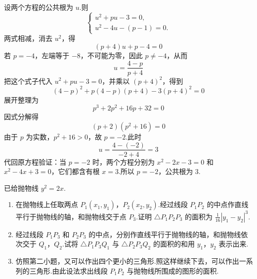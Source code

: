 \begin{solution}
设两个方程的公共根为 \(u\).则
\[
\begin{cases}
u^2+pu-3=0,\\
u^2-4u-(p-1)=0.
\end{cases}
\]
两式相减，消去 \(u^2\)，得
\[
(p+4)u+p-4=0
\]
若 \(p=-4\)，左端等于 \(-8\)，不可能为零，因此 \(p\neq-4\)，从而
\[
u=\frac{4-p}{p+4}
\]
把这个式子代入 \(u^2+pu-3=0\)，并乘以 \((p+4)^2\)，得到
\[
(4-p)^2+p(4-p)(p+4)-3(p+4)^2=0
\]
展开整理为
\[
p^3+2p^2+16p+32=0
\]
因式分解得
\[
(p+2)(p^2+16)=0
\]
由于 \(p\) 为实数，\(p^2+16>0\)，故 \(p=-2\).此时
\[
u=\frac{4-(-2)}{-2+4}=3
\]
代回原方程验证：当 \(p=-2\) 时，两个方程分别为 \(x^2-2x-3=0\) 和 \(x^2-4x+3=0\)，它们都含有根 \(x=3\).所以 \(p=-2\)，公共根为 \(3\).
\end{solution}

\begin{problem}
已给抛物线 \(y^2=2x\).

\begin{enumerate}
\item 在抛物线上任取两点 \(P_1(x_1,y_1)\)，\(P_2(x_2,y_2)\).经过线段 \(P_1P_2\) 的中点作直线平行于抛物线的轴，和抛物线交于点 \(P_3\).证明 \(\triangle P_1P_2P_3\) 的面积为 \(\frac{1}{16}|y_1-y_2|^3\).
\item 经过线段 \(P_1P_3\) 和 \(P_2P_3\) 的中点，分别作直线平行于抛物线的轴，和抛物线依次交于 \(Q_1\)，\(Q_2\).试将 \(\triangle P_1P_3Q_1\) 与 \(\triangle P_2P_3Q_2\) 的面积的和用 \(y_1\)，\(y_2\) 表示出来.
\item 仿照第二小题，又可以作出四个更小的三角形.照这样继续下去，可以作出一系列的三角形.由此设法求出线段 \(P_1P_2\) 与抛物线所围成的图形的面积.
\end{enumerate}

\end{problem}

